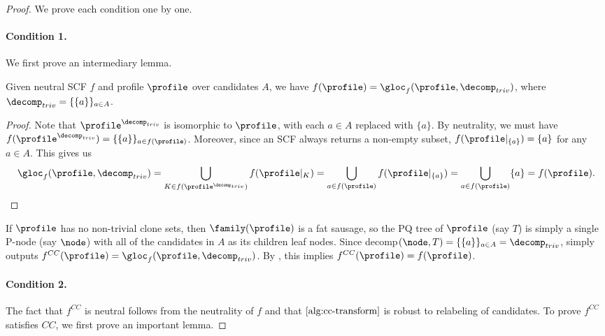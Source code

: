 \begin{proof}
We prove each condition one by one.
    \paragraph{Condition 1.} We first prove an intermediary lemma.
    \begin{lemma}\label{lemma:triv decomp}
        Given neutral SCF $f$ and profile $\profile$ over candidates $A$, we have $f(\profile)=\gloc_{f}(\profile,\decomp_{triv})$, where $\decomp_{triv}=\{\{a\}\}_{a \in A}$.
    \end{lemma}
    \begin{proof}
        Note that $\profile^{\decomp_{triv}}$ is isomorphic to $\profile$, with each $a\in A$ replaced with $\{a\}$. By neutrality, we must have $f(\profile^{\decomp_{triv}}) =\{\{a\}\}_{a \in f(\profile)}$. Moreover, since an SCF always returns a non-empty subset, $f(\profile|_{\{a\}})=\{a\}$ for any $a \in A$. This gives us
        \begin{align*}
            \gloc_f(\profile, \decomp_{triv})= \bigcup_{K \in f(\profile^{\decomp_{triv}})} f(\profile|_{K}) =   \bigcup_{a \in f(\profile)} f(\profile|_{\{a\}})= \bigcup_{a \in f(\profile)} \{a\}= f(\profile).
        \end{align*}
    \end{proof}

    
    If $\profile$ has no non-trivial clone sets, then $\family(\profile)$ is a fat sausage, so the PQ tree of $\profile$ (say $T$) is simply a single P-node (say $\node$) with all of the candidates in $A$ as its children leaf nodes. Since decomp$(\node,T)=\{\{a\}\}_{a \in A}=\decomp_{triv}$,   simply outputs $f^{CC}(\profile)=\gloc_{f}(\profile,\decomp_{triv})$. By , this implies $f^{CC}(\profile)=f(\profile)$.

    \paragraph{Condition 2.} The fact that $f^{CC}$ is neutral follows from the neutrality of $f$ and that $\Cref{alg:cc-transform}$ is robust to relabeling of candidates. To prove $f^{CC}$ satisfies $CC$, we first prove an important lemma.


\end{proof}
